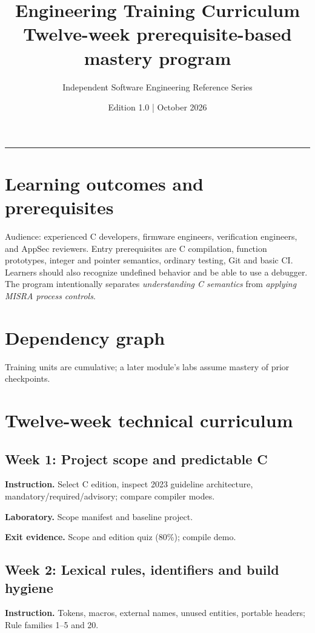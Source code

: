\documentclass[10pt,letterpaper]{article}
\title{\vspace{-2.3em}\color{DeepNavy}\Huge\bfseries Engineering Training Curriculum\\[0.45em]\large\normalfont\color{Teal} Twelve-week prerequisite-based mastery program}
\author{Independent Software Engineering Reference Series}
\date{Edition 1.0 \quad | \quad October 2026}
\begin{document}
\maketitle
\vspace{-0.4em}
\begin{center}\color{Slate}\rule{0.83\linewidth}{0.4pt}\end{center}
\DocNotes
\tableofcontents
\newpage

\section{Learning outcomes and prerequisites}
Audience: experienced C developers, firmware engineers, verification engineers, and AppSec reviewers. Entry prerequisites are C compilation, function prototypes, integer and pointer semantics, ordinary testing, Git and basic CI. Learners should also recognize undefined behavior and be able to use a debugger. The program intentionally separates \emph{understanding C semantics} from \emph{applying MISRA process controls}.
\section{Dependency graph}
\begin{center}\end{center}
Training units are cumulative; a later module's labs assume mastery of prior checkpoints.
\section{Twelve-week technical curriculum}
\subsection{Week 1: Project scope and predictable C}
\textbf{Instruction.} Select C edition, inspect 2023 guideline architecture, mandatory/required/advisory; compare compiler modes.

\textbf{Laboratory.} Scope manifest and baseline project.

\textbf{Exit evidence.} Scope and edition quiz (80\%); compile demo.

\subsection{Week 2: Lexical rules, identifiers and build hygiene}
\textbf{Instruction.} Tokens, macros, external names, unused entities, portable headers; Rule families 1--5 and 20.
\end{document}
